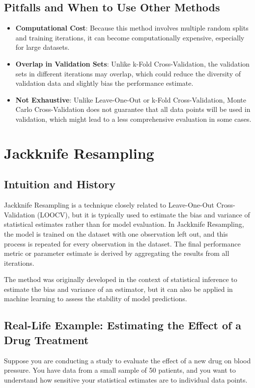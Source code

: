 \documentclass[10pt]{article}
\begin{document}
\subsection{Pitfalls and When to Use Other Methods}
\begin{itemize}
    \item \textbf{Computational Cost}: Because this method involves multiple random splits and training iterations, it can become computationally expensive, especially for large datasets.
    \item \textbf{Overlap in Validation Sets}: Unlike k-Fold Cross-Validation, the validation sets in different iterations may overlap, which could reduce the diversity of validation data and slightly bias the performance estimate.
    \item \textbf{Not Exhaustive}: Unlike Leave-One-Out or k-Fold Cross-Validation, Monte Carlo Cross-Validation does not guarantee that all data points will be used in validation, which might lead to a less comprehensive evaluation in some cases.
\end{itemize}

\section{Jackknife Resampling}
\subsection{Intuition and History}
Jackknife Resampling is a technique closely related to Leave-One-Out Cross-Validation (LOOCV), but it is typically used to estimate the bias and variance of statistical estimates rather than for model evaluation. In Jackknife Resampling, the model is trained on the dataset with one observation left out, and this process is repeated for every observation in the dataset. The final performance metric or parameter estimate is derived by aggregating the results from all iterations.

The method was originally developed in the context of statistical inference to estimate the bias and variance of an estimator, but it can also be applied in machine learning to assess the stability of model predictions.

\subsection{Real-Life Example: Estimating the Effect of a Drug Treatment}
Suppose you are conducting a study to evaluate the effect of a new drug on blood pressure. You have data from a small sample of 50 patients, and you want to understand how sensitive your statistical estimates are to individual data points.
\end{document}
